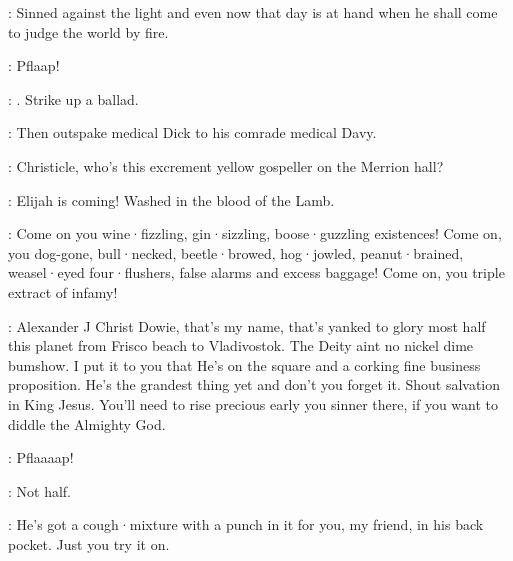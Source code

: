 \dowie:
Sinned against the light and even now that day is at hand
when he shall come to judge the world by fire.

:
Pflaap!

\stephen:
.
Strike up a ballad.

:
Then outspake medical Dick to his comrade medical Davy.

\bystander:
Christicle,
who's this excrement yellow gospeller on the Merrion hall?

\dowie:
Elijah is coming!
Washed in the blood of the Lamb.

\dowie:
Come on you wine·fizzling,
gin·sizzling,
boose·guzzling existences!
Come on,
you dog-gone,
bull·necked,
beetle·browed,
hog·jowled,
peanut·brained,
weasel·eyed four·flushers,
false alarms and excess baggage!
Come on,
you triple extract of infamy!

\dowie:
Alexander J Christ Dowie,
that's my name,
that's
yanked to glory most half this planet from Frisco beach to Vladivostok.
The Deity aint no nickel dime bumshow.
I put it to you that He's on the square and a corking fine business proposition.
He's the grandest thing yet and don't you forget it.
Shout salvation in King Jesus.
You'll need to rise precious early you sinner there,
if you want to diddle the Almighty God.

:
Pflaaaap!

\stephen:
Not half.

\dowie:
He's got a cough·mixture with a punch in it for you,
my friend,
in his back pocket.
Just you try it on.
